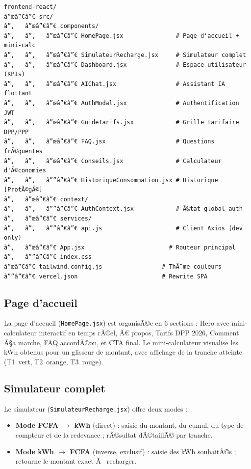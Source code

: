 \documentclass[12pt,a4paper]{report}
\begin{document}
\begin{lstlisting}[language={},caption={Arborescence du frontend React}]
frontend-react/
â”œâ”€â”€ src/
â”‚   â”œâ”€â”€ components/
â”‚   â”‚   â”œâ”€â”€ HomePage.jsx               # Page d'accueil + mini-calc
â”‚   â”‚   â”œâ”€â”€ SimulateurRecharge.jsx     # Simulateur complet
â”‚   â”‚   â”œâ”€â”€ Dashboard.jsx              # Espace utilisateur (KPIs)
â”‚   â”‚   â”œâ”€â”€ AIChat.jsx                 # Assistant IA flottant
â”‚   â”‚   â”œâ”€â”€ AuthModal.jsx              # Authentification JWT
â”‚   â”‚   â”œâ”€â”€ GuideTarifs.jsx            # Grille tarifaire DPP/PPP
â”‚   â”‚   â”œâ”€â”€ FAQ.jsx                    # Questions frÃ©quentes
â”‚   â”‚   â”œâ”€â”€ Conseils.jsx               # Calculateur d'Ã©conomies
â”‚   â”‚   â””â”€â”€ HistoriqueConsommation.jsx # Historique [ProtÃ©gÃ©]
â”‚   â”œâ”€â”€ context/
â”‚   â”‚   â””â”€â”€ AuthContext.jsx            # Ã‰tat global auth
â”‚   â”œâ”€â”€ services/
â”‚   â”‚   â””â”€â”€ api.js                     # Client Axios (dev only)
â”‚   â”œâ”€â”€ App.jsx                        # Routeur principal
â”‚   â””â”€â”€ index.css
â”œâ”€â”€ tailwind.config.js                 # ThÃ¨me couleurs
â””â”€â”€ vercel.json                        # Rewrite SPA
\end{lstlisting}

\subsection{Page d'accueil}

La page d'accueil (\texttt{HomePage.jsx}) est organisÃ©e en 6 sections : Hero avec mini-calculateur interactif en temps rÃ©el, Ã€ propos, Tarifs DPP 2026, Comment Ã§a marche, FAQ accordÃ©on, et CTA final. Le mini-calculateur visualise les kWh obtenus pour un glisseur de montant, avec affichage de la tranche atteinte (T1~vert, T2~orange, T3~rouge).

\subsection{Simulateur complet}

Le simulateur (\texttt{SimulateurRecharge.jsx}) offre deux modes :
\begin{itemize}
  \item \textbf{Mode FCFA $\rightarrow$ kWh} (direct) : saisie du montant, du cumul, du type de compteur et de la redevance ; rÃ©sultat dÃ©taillÃ© par tranche.
  \item \textbf{Mode kWh $\rightarrow$ FCFA} (inverse, exclusif) : saisie des kWh souhaitÃ©s ; retourne le montant exact Ã  recharger.
\end{itemize}
\end{document}
